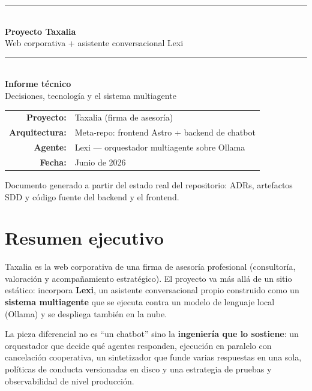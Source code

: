 \documentclass[11pt,a4paper]{article}
\begin{document}
\begin{titlepage}
\thispagestyle{empty}
\centering
\vspace*{2.5cm}
{\color{tax-gold}\rule{\linewidth}{2pt}}\\[0.6cm]
{\Huge\bfseries\color{tax-ink} Proyecto Taxalia}\\[0.4cm]
{\LARGE\color{tax-slate} Web corporativa + asistente conversacional Lexi}\\[0.3cm]
{\color{tax-gold}\rule{\linewidth}{2pt}}\\[1.2cm]

{\large\bfseries Informe técnico}\\[0.3cm]
{\large Decisiones, tecnología y el sistema multiagente}\\[2.5cm]

\begin{tabular}{rl}
  \textbf{Proyecto:}    & Taxalia (firma de asesoría) \\[3pt]
  \textbf{Arquitectura:}& Meta-repo: frontend Astro + backend de chatbot \\[3pt]
  \textbf{Agente:}      & Lexi — orquestador multiagente sobre Ollama \\[3pt]
  \textbf{Fecha:}       & Junio de 2026 \\
\end{tabular}

\vfill
{\small\color{tax-slate} Documento generado a partir del estado real del
repositorio: ADRs, artefactos SDD y código fuente del backend y el frontend.}
\end{titlepage}

\tableofcontents
\newpage

\section{Resumen ejecutivo}

Taxalia es la web corporativa de una firma de asesoría profesional
(consultoría, valoración y acompañamiento estratégico). El proyecto va más
allá de un sitio estático: incorpora \textbf{Lexi}, un asistente
conversacional propio construido como un \textbf{sistema multiagente} que se
ejecuta contra un modelo de lenguaje local (Ollama) y se despliega también en
la nube.

La pieza diferencial no es ``un chatbot'' sino la \textbf{ingeniería que lo
sostiene}: un orquestador que decide qué agentes responden, ejecución en
paralelo con cancelación cooperativa, un sintetizador que funde varias
respuestas en una sola, políticas de conducta versionadas en disco y una
estrategia de pruebas y observabilidad de nivel producción.
\end{document}
